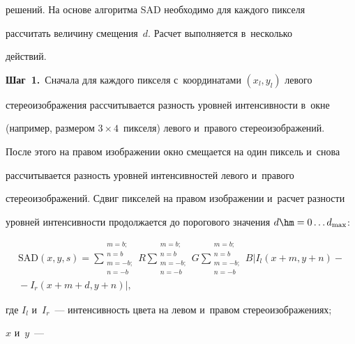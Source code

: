 решений. На основе алгоритма SAD необходимо для каждого пикселя 


рассчитать величину смещения~$d$. Расчет выполняется в~несколько 


действий.


  


  \textbf{Шаг~1.}\ Сначала для каждого пикселя с~координатами $(x_l, y_l)$ левого 


стереоизображения рассчитывается разность уровней интенсивности в~окне 


(например, размером $3\times4$~пикселя) левого и~правого стереоизображений. 


После этого на правом изображении окно смещается на один пиксель и~снова 


рассчитывается разность уровней интенсивностей левого и~правого 


стереоизображений. Сдвиг пикселей на правом изображении и~расчет разности 


уровней интенсивности продолжается до порогового значения $d\hm= 0\ldots 


d_{\max}$:


  \setcounter{equation}{6}


  \begin{multline}


  \mathrm{SAD}\left(x,y,s\right)=\sum


  \limits_{\substack{{m=-b;}\\ {n=-b}}}^{\substack{{m=b;}\\ {n=b}}} \!\! R


  \sum\limits^{\substack{{m=b;}\\ {n=b}}}_{\substack{{m=-b;}\\ {n=-b}}} \!\!G 


  \sum\limits_{\substack{{m=-b;}\\ {n=-b}}}^{\substack{{m=b;}\\ {n=b}}}\!\!


  B\left\vert I_l(x+m, y+n)-{}\right.\\


 \left. {}-I_r(x+m+d, y+n)\right\vert,\!\!


  \label{e7-bob}


  \end{multline}


где $I_l$ и~$I_r$~--- интенсивность цвета на левом и~правом стереоизображениях; 


$x$ и~$y$~--- 


